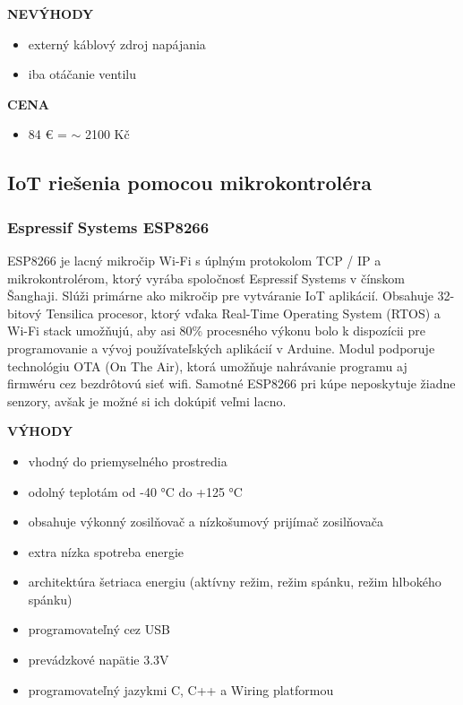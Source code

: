 \documentclass[twoside]{ctuthesis}
\theoremstyle{plain}
\theoremstyle{definition}
\theoremstyle{note}
\begin{document}
\textbf{NEVÝHODY}
\begin{itemize}
\item externý káblový zdroj napájania
\item iba otáčanie ventilu
\end{itemize}

\textbf{CENA}
\begin{itemize}
\item 84 € = $\sim$ 2100 Kč
\end{itemize}

\subsection{IoT riešenia pomocou mikrokontroléra}

\subsubsection*{Espressif Systems ESP8266 } 
\label{sec:esp}
ESP8266 je lacný mikročip Wi-Fi s úplným protokolom TCP / IP a mikrokontrolérom, ktorý vyrába spoločnosť Espressif Systems v čínskom Šanghaji. Slúži primárne ako mikročip pre vytváranie IoT aplikácií. Obsahuje 32-bitový Tensilica procesor, ktorý vďaka Real-Time Operating System (RTOS) a Wi-Fi stack umožňujú, aby asi 80\% procesného výkonu bolo k dispozícii pre programovanie a vývoj používateľských aplikácií v Arduine. Modul podporuje technológiu OTA (On The Air), ktorá umožňuje nahrávanie programu aj firmwéru cez bezdrôtovú sieť wifi. Samotné ESP8266 pri kúpe neposkytuje žiadne senzory, avšak je možné si ich dokúpiť veľmi lacno. \cite{conclusionSolution} \cite{esp}
\newline

\textbf{VÝHODY}
\begin{itemize}
\item vhodný do priemyselného prostredia
\item odolný teplotám od -40 °C do +125 °C
\item obsahuje výkonný zosilňovač a nízkošumový prijímač zosilňovača
\item extra nízka spotreba energie
\item architektúra šetriaca energiu (aktívny režim, režim spánku, režim hlbokého spánku)
\item programovateľný cez USB
\item prevádzkové napätie 3.3V
\item programovateľný jazykmi C, C++ a Wiring platformou
\end{itemize}
\end{document}
